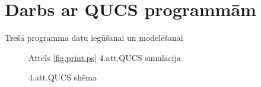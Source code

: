 \documentclass{report}
\begin{document}
{\section{Darbs ar QUCS programmām}
Trešā programma datu iegūšanai un modelēšanai

\begin{center}
\begin{figure}[!h]
\caption{4.att.QUCS shēma}
\label{fig:01.ps}
Attēls \ref{fig:print.ps} 4.att.QUCS simulācija
\end{figure}
\end{center}

}
\end{document}

